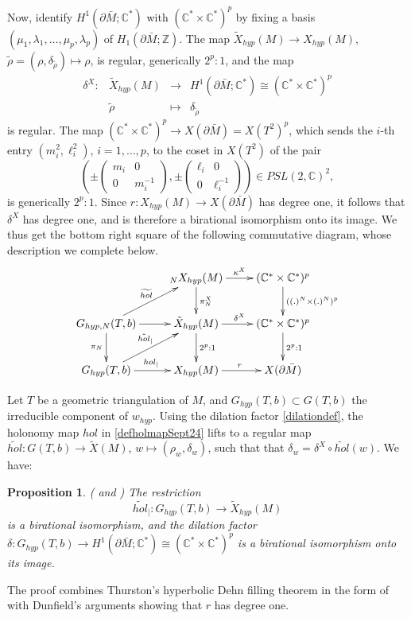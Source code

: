 \documentclass[11pt]{amsart}
\newtheorem{prop}[teo]{Proposition}
\newcommand{\fonc}[5]{                     %
            \begin{array}{lcll}#1 :& #2 & \longrightarrow & #3 \\   %
                         &#4 &\longmapsto & #5          %
            \end{array}}
\newcommand{\mc}{\mathbb{C}}
\newcommand{\mz}{\mathbb{Z}}
\newcommand{\ra}{\rightarrow}
\begin{document}
{Now, identify $H^1(\partial \bar M;\mc^*)$ with $(\mc^*\times \mc^*)^p$ by fixing a basis $(\mu_1,\lambda_1,\ldots, \mu_p,\lambda_p)$ of $H_1(\partial \bar M;\mz)$. The map $\tilde{X}_{hyp}(M) \rightarrow X_{hyp}(M)$, $\tilde{\rho}= (\rho,\delta_{\tilde \rho}) \mapsto \rho$, is regular, generically $2^p\colon 1$, and the map
$$\fonc{\delta^X}{\tilde{X}_{hyp}(M)}{H^1(\partial \bar M;\mc^*)\cong (\mc^*\times \mc^*)^p}{\tilde{\rho}}{\delta_{\tilde \rho}}$$ is regular. The map $(\mc^*\times \mc^*)^p\ra X(\partial \bar M)=X(T^2)^p$, which sends the $i$-th entry $(m_i^2,\ell_i^2)$, $i=1,\ldots, p$, to the coset in $X(T^2)$ of the pair
$$\left( \pm \begin{pmatrix} m_i & 0 \\ 0 & m_i^{-1}\end{pmatrix}, \pm \begin{pmatrix} \ell_i & 0 \\ 0 & \ell_i^{-1}\end{pmatrix}\right) \in PSL(2,\mc)^2,$$ is generically $2^p\colon 1$. Since $r\colon X_{hyp}(M) \ra X(\partial \bar M)$ has degree one, it follows that $\delta^X$ has degree one, and is therefore a birational isomorphism onto its image. We thus get the bottom right square of the following commutative diagram, whose description we complete below.
$$\xymatrix{ &  {}_NX_{hyp}(M) \ar[d]^{\pi_N^X} \ar[r]^{\kappa^X} & (\mc^* \times \mc^*)^p \ar[d]^{((.)^N \times (.)^N)^p} \\ G_{hyp,N}(T,b)  \ar[d]_{\pi_N} \ar[r] \ar[ru]^{\widetilde{hol}} & \tilde{X}_{hyp}(M) \ar[r]^{\delta^X} \ar[d]^{2^p:1} & (\mc^* \times \mc^*)^p \ar[d]^{2^p:1}\\G_{hyp}(T,b) \ar[r]^{hol_{\vert}}\ar[ru]^{\tilde{hol}_{\vert}} & X_{hyp}(M) \ar[r]^{r} & X(\partial \bar M)}$$

Let $T$ be a geometric triangulation of $M$, and $G_{hyp}(T,b)\subset G(T,b)$ the irreducible component of $w_{hyp}$. Using the dilation factor \eqref{dilationdef}, the holonomy map $hol$ in \eqref{defholmapSept24} lifts to a regular map $\tilde{hol}\colon G(T,b)\rightarrow \tilde{X}(M)$, $w\mapsto (\rho_w,\delta_w)$, such that that $\delta_w = \delta^X \circ \tilde{hol}(w)$. We have:
\begin{prop} {\rm (\cite[Proposition 4.6]{AGT} and \cite[Remark 1.4]{NA}) The restriction  
\begin{equation}\label{tildeholresmars25}
\tilde{hol}_{\vert}\colon G_{hyp}(T,b)\rightarrow \tilde{X}_{hyp}(M)
\end{equation}
is a birational isomorphism, and the dilation factor $\delta\colon G_{hyp}(T,b)\rightarrow H^1(\partial \bar M;\mc^*)\cong (\mc^*\times \mc^*)^p$ is a birational isomorphism onto its image.}
\end{prop}
The proof combines Thurston's hyperbolic Dehn filling theorem in the form of \cite{PP, Martelli} with Dunfield's arguments showing that $r$ has degree one.

}
\end{document}

